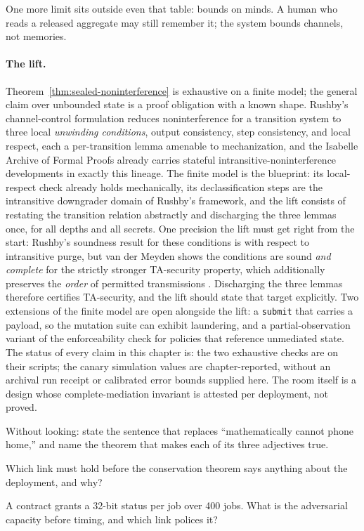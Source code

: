 \documentclass[11pt,a4paper]{article}
\theoremstyle{definition}
\begin{document}
\FloatBarrier
One more limit sits outside even that table: bounds on minds. A human who
reads a released aggregate may still remember it; the system bounds
channels, not memories.

\paragraph{The lift.}
Theorem~\ref{thm:sealed-noninterference} is exhaustive on a finite model; the
general claim over unbounded state is a proof obligation with a known shape.
Rushby's channel-control formulation  reduces noninterference for
a transition system to three local \emph{unwinding conditions}, output
consistency, step consistency, and local respect, each a per-transition lemma
amenable to mechanization, and the Isabelle Archive of Formal Proofs already
carries stateful intransitive-noninterference developments in exactly this
lineage. The finite model is the blueprint: its local-respect check already
holds mechanically, its declassification steps are the intransitive
downgrader domain of Rushby's framework, and the lift consists of restating the
transition relation abstractly and discharging the three lemmas once, for all
depths and all secrets. One precision the lift must get right from the start:
Rushby's soundness result for these conditions is with respect to intransitive
purge, but van der Meyden shows the conditions are sound \emph{and complete}
for the strictly stronger TA-security property, which additionally preserves
the \emph{order} of permitted transmissions . Discharging the
three lemmas therefore certifies TA-security, and the lift should state that
target explicitly. Two extensions of the finite model are open alongside the
lift: a \texttt{submit} that carries a payload, so the mutation suite can
exhibit laundering, and a partial-observation variant of the enforceability
check for policies that reference unmediated state. The status of every claim
in this chapter is: the two exhaustive checks are  on
their scripts; the canary simulation values are chapter-reported, without an
archival run receipt or calibrated error bounds supplied here. The room itself is a
 design whose complete-mediation invariant is attested
per deployment, not proved.

\pdexercisepointer*{\ref{ex:sealed-pairs}}{\ref{ex:sealed-budget}}{\pageref{ex:sealed-pairs}}
\begin{pdrecitation}
\item Without looking: state the sentence that replaces ``mathematically cannot
  phone home,'' and name the theorem that makes each of its three adjectives
  true.
\item Which link must hold before the conservation theorem says anything about
  the deployment, and why?
\item A contract grants a 32-bit status per job over 400 jobs. What is the
  adversarial capacity before timing, and which link polices it?
\end{pdrecitation}
\end{document}
